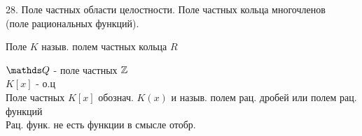 \documentclass[12pt, fleqn]{article}
\begin{document}
\begin{question} {28. Поле частных области целостности. Поле частных кольца многочленов \\(поле рациональных функций).}
\begin{definition}
        \begin{definition} 
            Поле $K$ назыв. полем частных кольца $R$
        \end{definition}

        \begin{examples} 
            $\Q$ - поле частных $\mathbb{Z}$\\
            $K[x]$ - о.ц\\
            Поле частных $K[x]$ обознач. $K(x)$ и назыв. полем рац. дробей или полем рац. функций\\
            Рац. функ. не есть функции в смысле отобр.
        \end{examples}
    \end{definition}


\end{question}
\end{document}
